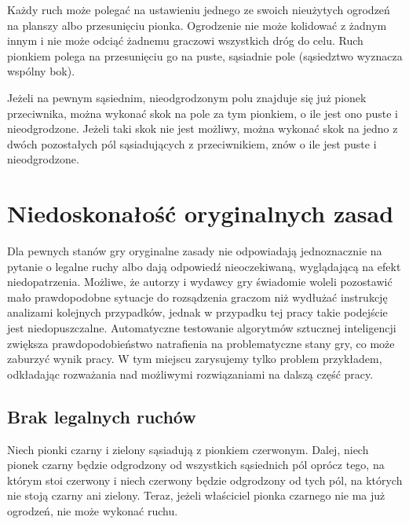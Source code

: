 \documentclass{pracamgr}
\begin{document}
Każdy ruch może polegać na ustawieniu jednego ze swoich nieużytych ogrodzeń na planszy albo przesunięciu pionka. Ogrodzenie nie może kolidować z żadnym innym i nie może odciąć żadnemu graczowi wszystkich dróg do celu. Ruch pionkiem polega na przesunięciu go na puste, sąsiadnie pole (sąsiedztwo wyznacza wspólny bok).

Jeżeli na pewnym sąsiednim, nieodgrodzonym polu znajduje się już pionek przeciwnika, można wykonać skok na pole za tym pionkiem, o ile jest ono puste i nieodgrodzone. Jeżeli taki skok nie jest możliwy, można wykonać skok na jedno z dwóch pozostałych pól sąsiadujących z przeciwnikiem, znów o ile jest puste i nieodgrodzone.

\section{Niedoskonałość oryginalnych zasad}

Dla pewnych stanów gry oryginalne zasady nie odpowiadają jednoznacznie na pytanie o legalne ruchy albo dają odpowiedź nieoczekiwaną, wyglądającą na efekt niedopatrzenia. Możliwe, że autorzy i wydawcy gry świadomie woleli pozostawić mało prawdopodobne sytuacje do rozsądzenia graczom niż wydłużać instrukcję analizami kolejnych przypadków, jednak w przypadku tej pracy takie podejście jest niedopuszczalne. Automatyczne testowanie algorytmów sztucznej inteligencji zwiększa prawdopodobieństwo natrafienia na problematyczne stany gry, co może zaburzyć wynik pracy. W tym miejscu zarysujemy tylko problem przykładem, odkładając rozważania nad możliwymi rozwiązaniami na dalszą część pracy.

\subsection*{Brak legalnych ruchów}

Niech pionki czarny i zielony sąsiadują z pionkiem czerwonym. Dalej, niech pionek czarny będzie odgrodzony od wszystkich sąsiednich pól oprócz tego, na którym stoi czerwony i niech czerwony będzie odgrodzony od tych pól, na których nie stoją czarny ani zielony. Teraz, jeżeli właściciel pionka czarnego nie ma już ogrodzeń, nie może wykonać ruchu.
\end{document}
